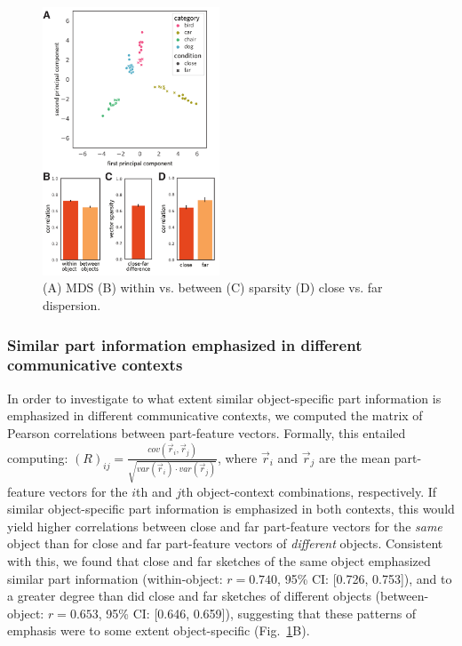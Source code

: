 \documentclass[10pt,letterpaper]{article}
\newcommand{\jefan}[1]{{\color{blue}{[jefan: #1]}}}
\begin{document}
\begin{figure}[htbp]
\centering
\includegraphics[width=0.47\textwidth]{figures/7_part_emphasis.pdf}
\caption{(A) MDS (B) within vs. between (C) sparsity (D) close vs. far dispersion. \jefan{These captions need to be filled in properly -- brief, one sentence or fragment each.}}
\label{part_emphasis}
\end{figure}

\subsubsection{Similar part information emphasized in different communicative contexts}

In order to investigate to what extent similar object-specific part information is emphasized in different communicative contexts, we computed the matrix of Pearson correlations between part-feature vectors. 
Formally, this entailed computing: $(R)_{ij} =  \frac{cov(\vec{r}_{i}, \vec{r}_{j})}{\sqrt{var(\vec{r}_{i}) \cdot var(\vec{r}_{j})}}$, where $\vec{r}_{i}$ and $\vec{r}_{j}$ are the mean part-feature vectors for the $i$th and $j$th object-context combinations, respectively.
If similar object-specific part information is emphasized in both contexts, this would yield higher correlations between close and far part-feature vectors for the \textit{same} object than for close and far part-feature vectors of \textit{different} objects. 
Consistent with this, we found that close and far sketches of the same object emphasized similar part information (within-object: $r = 0.740$, 95\% CI: [0.726, 0.753]), and to a greater degree than did close and far sketches of different objects (between-object: $r = 0.653$, 95\% CI: [0.646, 0.659]), suggesting that these patterns of emphasis were to some extent object-specific (Fig.~\ref{part_emphasis}B). 
\end{document}
